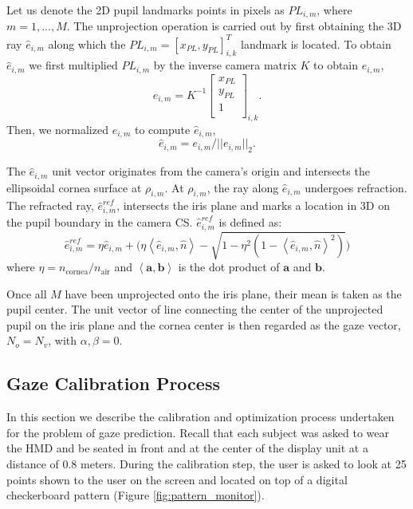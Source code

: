 \documentclass{article}
\begin{document}
Let us denote the 2D pupil landmarks points in pixels as $PL_{i,m}$, where $m=1,...,M$. The unprojection operation is carried out by first obtaining the 3D ray $\hat{e}_{i,m}$ along which the $PL_{i,m} = [x_{PL}, y_{PL}]_{i,k}^T$ landmark is located. To obtain $\hat{e}_{i,m}$ we first multiplied $PL_{i,m}$ by the inverse camera matrix $K$ to obtain ${e}_{i,m}$,
\begin{equation}
{e}_{i,m} = K^{-1} 
\begin{bmatrix}
x_{PL}\\
y_{PL}\\
1\\
\end{bmatrix}_{i,k}.
\end{equation}
Then, we normalized  ${e}_{i,m}$ to compute $\hat{e}_{i,m}$,
\begin{equation}
\hat{e}_{i,m} = {e}_{i,m} / ||{e}_{i,m}||_2.
\end{equation}

The $\hat{e}_{i,m}$ unit vector originates from the camera's origin and intersects the ellipsoidal cornea surface at $\rho_{i,m}$. At $\rho_{i,m}$, the ray along $\hat{e}_{i,m}$ undergoes refraction.  The refracted ray, $\hat{e}_{i,m}^{ref}$, intersects the iris plane and marks a location in 3D on the pupil boundary in the camera CS.  $\hat{e}_{i,m}^{ref}$ is defined as:
\begin{equation}
\hat{e}_{i,m}^{ref} =\eta \hat{e}_{i,m} + \biggl(\eta \left<\hat{e}_{i,m}, \hat{n} \right> - \sqrt{1 - \eta^2(1 - \left<\hat{e}_{i,m}, \hat{n} \right>^2)} \biggr)
\end{equation}
where $\eta = n_{\text{cornea}}/n_{\text{air}}$ and $\left<\textbf{a}, \textbf{b} \right>$ is the dot product of $\textbf{a}$ and $\textbf{b}$.

Once all $M$ have been unprojected onto the iris plane, their mean is taken as the pupil center. The unit vector of line connecting the center of the unprojected pupil on the iris plane and the cornea center is then regarded as the gaze vector, $N_o = N_v$, with $\alpha, \beta = 0$.
 

\subsection{Gaze Calibration Process}
In this section we describe the calibration and optimization process undertaken for the problem of gaze prediction.  Recall that each subject was asked to wear the HMD and be seated in front and at the center of the display unit at a distance of 0.8 meters. During the calibration step, the user is asked to look at 25 points shown to the user on the screen and located on top of a digital checkerboard pattern (Figure \ref{fig:pattern_monitor}).  
\end{document}
